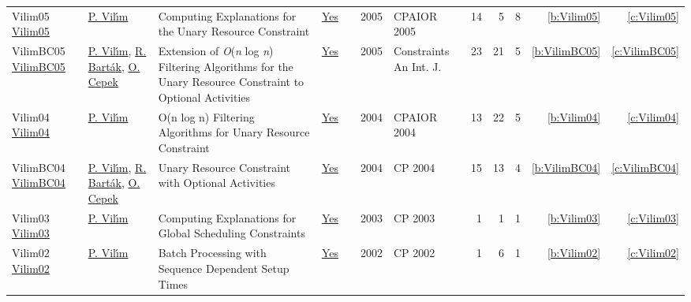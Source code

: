 {\begin{longtable}{>{\raggedright\arraybackslash}p{3cm}>{\raggedright\arraybackslash}p{6cm}>{\raggedright\arraybackslash}p{6.5cm}rrrp{2.5cm}rrrrr}
Vilim05 \href{https://doi.org/10.1007/11493853\_29}{Vilim05} & \hyperref[auth:a121]{P. Vil{\'{\i}}m} & Computing Explanations for the Unary Resource Constraint & \href{works/Vilim05.pdf}{Yes} & \cite{Vilim05} & 2005 & CPAIOR 2005 & 14 & 5 & 8 & \ref{b:Vilim05} & \ref{c:Vilim05}\\
VilimBC05 \href{https://doi.org/10.1007/s10601-005-2814-0}{VilimBC05} & \hyperref[auth:a121]{P. Vil{\'{\i}}m}, \hyperref[auth:a153]{R. Bart{\'{a}}k}, \hyperref[auth:a163]{O. Cepek} & Extension of \emph{O}(\emph{n} log \emph{n}) Filtering Algorithms for the Unary Resource Constraint to Optional Activities & \href{works/VilimBC05.pdf}{Yes} & \cite{VilimBC05} & 2005 & Constraints An Int. J. & 23 & 21 & 5 & \ref{b:VilimBC05} & \ref{c:VilimBC05}\\
Vilim04 \href{https://doi.org/10.1007/978-3-540-24664-0\_23}{Vilim04} & \hyperref[auth:a121]{P. Vil{\'{\i}}m} & O(n log n) Filtering Algorithms for Unary Resource Constraint & \href{works/Vilim04.pdf}{Yes} & \cite{Vilim04} & 2004 & CPAIOR 2004 & 13 & 22 & 5 & \ref{b:Vilim04} & \ref{c:Vilim04}\\
VilimBC04 \href{https://doi.org/10.1007/978-3-540-30201-8\_8}{VilimBC04} & \hyperref[auth:a121]{P. Vil{\'{\i}}m}, \hyperref[auth:a153]{R. Bart{\'{a}}k}, \hyperref[auth:a163]{O. Cepek} & Unary Resource Constraint with Optional Activities & \href{works/VilimBC04.pdf}{Yes} & \cite{VilimBC04} & 2004 & CP 2004 & 15 & 13 & 4 & \ref{b:VilimBC04} & \ref{c:VilimBC04}\\
Vilim03 \href{https://doi.org/10.1007/978-3-540-45193-8\_124}{Vilim03} & \hyperref[auth:a121]{P. Vil{\'{\i}}m} & Computing Explanations for Global Scheduling Constraints & \href{works/Vilim03.pdf}{Yes} & \cite{Vilim03} & 2003 & CP 2003 & 1 & 1 & 1 & \ref{b:Vilim03} & \ref{c:Vilim03}\\
Vilim02 \href{https://doi.org/10.1007/3-540-46135-3\_62}{Vilim02} & \hyperref[auth:a121]{P. Vil{\'{\i}}m} & Batch Processing with Sequence Dependent Setup Times & \href{works/Vilim02.pdf}{Yes} & \cite{Vilim02} & 2002 & CP 2002 & 1 & 6 & 1 & \ref{b:Vilim02} & \ref{c:Vilim02}\\
\end{longtable}
}

